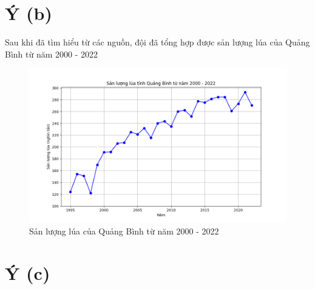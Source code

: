 \documentclass[12pt]{report}
\begin{document}
\section{Ý (b)} %
\label{sec:ý_}

\begin{flushleft}
	Sau khi đã tìm hiểu từ các nguồn, đội đã tổng hợp được sản lượng lúa của Quảng Bình từ năm 2000 - 2022
	\\[\baselineskip]

	\begin{figure}[!htbp]
		\centering
		\includegraphics[width = \textwidth]{images/sanluonglua.png}
		\caption{Sản lượng lúa của Quảng Bình từ năm 2000 - 2022}
		\label{fig:image}
	\end{figure}
\end{flushleft}

\newpage

\section{Ý (c)} %
\label{sec:ý_}
\end{document}
